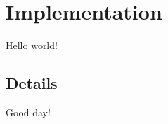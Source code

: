 \documentclass[11pt,openright,a4paper]{article}
\begin{document}
\section{Implementation}
Hello world!
\subsection{Details}
Good day!
\end{document}
